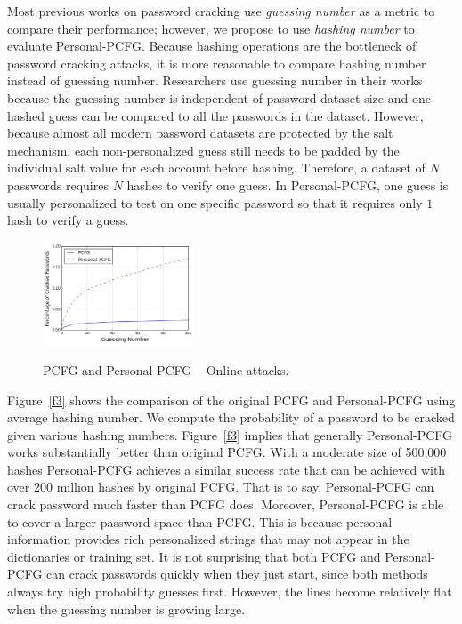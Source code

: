 Most previous works on password cracking use {\em guessing number} as
a metric to compare their performance; however, we propose to use {\em
  hashing number} to evaluate Personal-PCFG. 
%
Because hashing operations are the bottleneck of password cracking
attacks, it is more reasonable to compare hashing number instead of
guessing number. Researchers use guessing number in their works
because the guessing number is independent of password dataset size
and one hashed guess can be compared to all the passwords in the
dataset. However, because almost all modern password datasets are
protected by the salt mechanism, each non-personalized guess still
needs to be padded by the individual salt value for each account
before hashing. Therefore, a dataset of $N$ passwords requires $N$
hashes to verify one guess. In Personal-PCFG, one guess is usually
personalized to test on one specific password so that it requires only $1$
hash to verify a guess. 

\begin{figure}[t]
  \centering
  \caption{PCFG and Personal-PCFG -- Online attacks.}{}
  \label{cmp100}
  \includegraphics[width=0.4\textwidth]{fig/cmp100}
\vspace{-0.1in}
\end{figure}
Figure~\ref{f3} shows the comparison of the original PCFG and
Personal-PCFG using average hashing number. We compute the probability
of a password to be cracked given various hashing
numbers. Figure~\ref{f3} implies that generally Personal-PCFG works
substantially better than original PCFG. With a moderate size of 500,000 hashes
Personal-PCFG achieves a similar success rate that can be achieved with
over 200 million hashes by original PCFG. That is to
say, Personal-PCFG can crack password much faster than PCFG
does.  Moreover, Personal-PCFG is able to cover a larger password space
than PCFG. This is because personal information provides rich
personalized strings that may not appear in the dictionaries or training set.
%
It is not surprising that both PCFG and Personal-PCFG can crack
passwords quickly when they just start, since both methods always try
high probability guesses first. However, the lines become relatively
flat when the guessing number is growing large.

